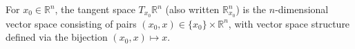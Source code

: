 For $x_0 \in \mathbb{R}^n$, the tangent space $T_{x_0}\mathbb{R}^n$ (also written $\mathbb{R}_{x_0}^n$) is the $n$-dimensional vector space consisting of pairs $(x_0, x) \in \{x_0\} \times \mathbb{R}^n$, with vector space structure defined via the bijection $(x_0, x) \mapsto x$.